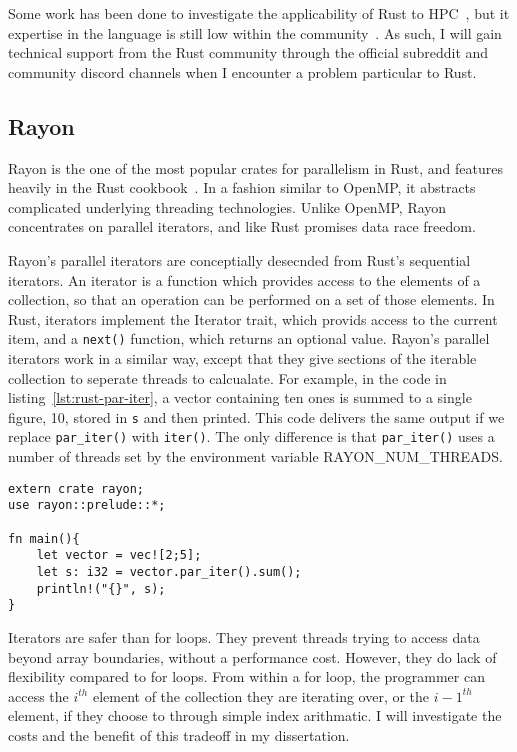 Some work has been done to investigate the applicability of Rust to HPC~, but it expertise in the language is still low within the community~. As such, I will gain technical support from the Rust community through the official subreddit and community discord channels when I encounter a problem particular to Rust.

\subsection{Rayon}\label{sec:back-rayon}
Rayon is the one of the most popular crates for parallelism in Rust, and features heavily in the Rust cookbook~\cite{RustCookPara}. In a fashion similar to OpenMP, it abstracts complicated underlying threading technologies. Unlike OpenMP, Rayon concentrates on parallel iterators, and like Rust promises data race freedom.

Rayon's parallel iterators are conceptially desecnded from Rust's sequential iterators. An iterator is a function which provides access to the elements of a collection, so that an operation can be performed on a set of those elements. In Rust, iterators implement the Iterator trait, which provids access to the current item, and a \texttt{next()} function, which returns an optional value. Rayon's parallel iterators work in a similar way, except that they give sections of the iterable collection to seperate threads to calcualate. For example, in the code in listing~\ref{lst:rust-par-iter}, a vector containing ten ones is summed to a single figure, 10, stored in \texttt{s} and then printed. This code delivers the same output if we replace \texttt{par\_iter()} with \texttt{iter()}. The only difference is that \texttt{par\_iter()} uses a number of threads set by the environment variable RAYON\_NUM\_THREADS.

\begin{code}
\begin{verbatim}
extern crate rayon;
use rayon::prelude::*;

fn main(){
    let vector = vec![2;5];
    let s: i32 = vector.par_iter().sum();
    println!("{}", s);
}
\end{verbatim}
\label{lst:rust-par-iter}
\end{code}

Iterators are safer than for loops. They prevent threads trying to access data beyond array boundaries, without a performance cost. However, they do lack of flexibility compared to for loops. From within a for loop, the programmer can access the $i^{th}$ element of the collection they are iterating over, or the $i-1^{th}$ element, if they choose to through simple index arithmatic. I will investigate the costs and the benefit of this tradeoff in my dissertation.

